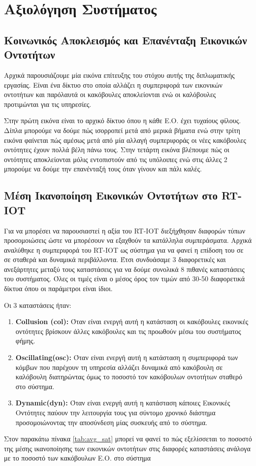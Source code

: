 \chapter{Aξιολόγηση Συστήματος}\label{ch:evaluation}

\section{Κοινωνικός Αποκλεισμός και Επανένταξη Εικονικών Οντοτήτων}
Αρχικά παρουσιάζουμε μία εικόνα επίτευξης του στόχου αυτής της διπλωματικής εργασίας. Είναι ένα δίκτυο στο οποία αλλάζει η συμπεριφορά των εικονικών οντοτήτων και παρόλαυτά οι κακόβουλες αποκλείονται ενώ οι καλόβουλες προτιμώνται για τις υπηρεσίες.


Στην πρώτη εικόνα είναι το αρχικό δίκτυο όπου η κάθε Ε.Ο. έχει τυχαίους φίλους. Δίπλα μπορούμε να δούμε πώς ισορροπεί μετά από μερικά βήματα ενώ στην τρίτη εικόνα φαίνεται πώς αμέσως μετά από μία αλλαγή συμπεριφοράς οι νέες κακόβουλες οντότητες έχουν πολλά βέλη πάνω τους. Στην τετάρτη εικόνα βλέπουμε πώς οι οντότητες αποκλείονται μόλις εντοπιστούν από τις υπόλοιπες ενώ στις άλλες 2 μπορούμε να δούμε την επανένταξή τους όταν γίνουν και πάλι καλές.
\newpage
\section{Μέση Ικανοποίηση Εικονικών Οντοτήτων στο RT-IOT}

Για να μπορέσει να παρουσιαστεί η αξία του RT-IOT διεξήχθησαν διαφορών τύπων προσομοιώσεις ώστε να μπορέσουν να εξαχθούν τα κατάλληλα συμπεράσματα. Αρχικά αναλύθηκε η συμπεριφορά του RT-IOT ως σύστημα για να φανεί η επίδοση του σε σε σταθερά και δυναμικά περιβάλλοντα. Έτσι συνδυάσαμε 3 διαφορετικές και ανεξάρτητες μεταξύ τους καταστάσεις για να δούμε συνολικά 8 πιθανές καταστάσεις του συστήματος. Όλες οι τιμές είναι ο μέσος όρος τον τιμών από 30-50 διαφορετικά δίκτυα όπου οι παράμετροι είναι ίδιοι.

Οι 3 καταστάσεις ήταν:
\begin{enumerate}
\item \textbf{Collusion (col):} Όταν είναι ενεργή αυτή η κατάσταση οι κακόβουλες εικονικές οντότητες βρίσκουν άλλες κακόβουλες και τις προωθούν μέσω του συστήματος φήμης.

\item\textbf{Οscillating(osc):} Όταν είναι ενεργή αυτή η κατάσταση η συμπεριφορά των κόμβων που παρέχουν τη υπηρεσία αλλάζει δυναμικά από κακόβουλη σε καλόβουλη διατηρώντας όμως το ποσοστό τον κακόβουλων οντοτήτων σταθερό στο σύστημα.

\item\textbf{Dynamic(dyn):} Όταν είναι ενεργή αυτή η κατάσταση κάποιες Εικονικές Οντότητες παύουν την λειτουργία τους για σύντομο χρονικό διάστημα προσομοιώνοντας την αποσύνδεση μίας συσκευής από το σύστημα.
\end{enumerate}
Στον παρακάτω πίνακα \ref{tab:avg_sat} μπορεί να φανεί το πώς εξελίσσεται το ποσοστό της μέσης ικανοποίησης των εικονικών οντοτήτων στις διαφορές καταστάσεις ανάλογα με το ποσοστό των κακόβουλων Ε.Ο. στο σύστημα


